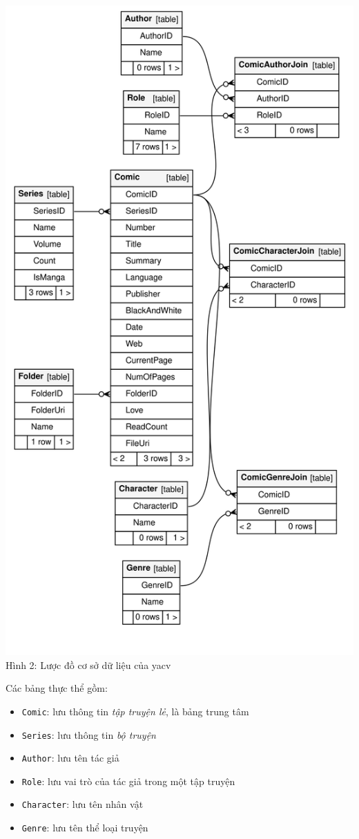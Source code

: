 \documentclass[
]{article}
\providecommand{\tightlist}{%
  \setlength{\itemsep}{0pt}\setlength{\parskip}{0pt}}
\begin{document}
\includegraphics{../images/relationships.real.large.svg} Hình 2: Lược đồ
cơ sở dữ liệu của yacv

Các bảng thực thể gồm:

\begin{itemize}
\tightlist
\item
  \texttt{Comic}: lưu thông tin \emph{tập truyện lẻ}, là bảng trung tâm
\item
  \texttt{Series}: lưu thông tin \emph{bộ truyện}
\item
  \texttt{Author}: lưu tên tác giả
\item
  \texttt{Role}: lưu vai trò của tác giả trong một tập truyện
\item
  \texttt{Character}: lưu tên nhân vật
\item
  \texttt{Genre}: lưu tên thể loại truyện
\end{itemize}
\end{document}

